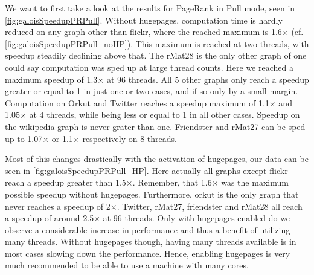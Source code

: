 We want to first take a look at the results for PageRank in Pull mode, seen in \autoref{fig:galoisSpeedupPRPull}. Without hugepages, computation time is hardly reduced on any graph other than flickr, where the reached maximum is 1.6$\times$ (cf. \autoref{fig:galoisSpeedupPRPull_noHP}). This maximum is reached at two threads, with speedup steadily declining above that.
The rMat28 is the only other graph of one could say computation was sped up at large thread counts. Here we reached a maximum speedup of 1.3$\times$ at 96 threads.
All 5 other graphs only reach a speedup greater or equal to 1 in just one or two cases, and if so only by a small margin.
Computation on Orkut and Twitter reaches a speedup maximum of 1.1$\times$ and 1.05$\times$ at 4 threads, while being less or equal to 1 in all other cases.
Speedup on the wikipedia graph is never grater than one.
Friendster and rMat27 can be sped up to 1.07$\times$ or 1.1$\times$ respectively on 8 threads.

Most of this changes drastically with the activation of hugepages, our data can be seen in \autoref{fig:galoisSpeedupPRPull_HP}. 
Here actually all graphs except flickr reach a speedup greater than 1.5$\times$. Remember, that 1.6$\times$ was the maximum possible speedup without hugepages.
Furthermore, orkut is the only graph that never reaches a speedup of 2$\times$.
Twitter, rMat27, friendster and rMat28 all reach a speedup of around 2.5$\times$ at 96 threads.
Only with hugepages enabled do we observe a considerable increase in performance and thus a benefit of utilizing many threads.
Without hugepages though, having many threads available is in most cases slowing down the performance. Hence, enabling hugepages is very much recommended to be able to use a machine with many cores.


